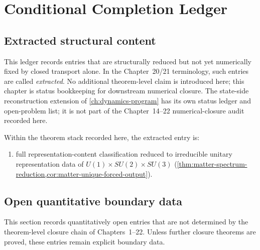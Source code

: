 \chapter{Conditional Completion Ledger}
\label{app:conditional-completion}

\begin{chapterorientation}
\end{chapterorientation}
\section{Extracted structural content}
\label{sec:cond-reduced}

This ledger records entries that are structurally reduced but not yet
numerically fixed by closed transport alone.
In the Chapter~20/21 terminology, such entries are called
\emph{extracted}.
No additional theorem-level claim is introduced here; this chapter is
status bookkeeping for downstream numerical closure. The state-side
reconstruction extension of \cref{ch:dynamics-program} has its own
status ledger and open-problem list; it is not part of the
Chapter~14--22 numerical-closure audit recorded here.

Within the theorem stack recorded here, the extracted entry is:
\begin{enumerate}[label=\textup{(\roman*)}]
\item
  full representation-content classification reduced to irreducible unitary
  representation data of
  \(U(1)\times SU(2)\times SU(3)\)
  (\cref{thm:matter-spectrum-reduction,cor:matter-unique-forced-output}).
\end{enumerate}

\section{Open quantitative boundary data}
\label{sec:cond-open}

This section records quantitatively open entries that are not determined by
the theorem-level closure chain of Chapters~1--22.
Unless further closure theorems are proved, these entries remain explicit
boundary data.

